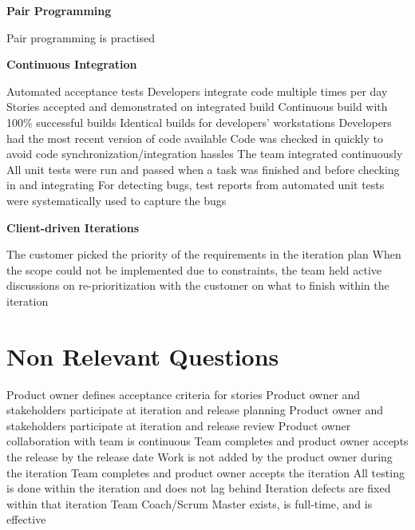 \begin{appendices}
\textbf{Pair Programming}
\begin{itemize}
	\taa Pair programming is practised
\end{itemize}

\textbf{Continuous Integration}
\begin{itemize}
	\taa Automated acceptance tests
	\taar Developers integrate code multiple times per day
	\taar Stories accepted and demonstrated on integrated build
	\taar Continuous build with 100\% successful builds
	\taar Identical builds for developers' workstations %
	\pam Developers had the most recent version of code available
	\pam Code was checked in quickly to avoid code synchronization/integration hassles
	\pamr The team integrated continuously
	\pamr All unit tests were run and passed when a task was finished and before checking in and integrating
	\pamr For detecting bugs, test reports from automated unit tests were systematically used to capture the bugs
\end{itemize}

\textbf{Client-driven Iterations}
\begin{itemize}
	\pam The customer picked the priority of the requirements in the iteration plan
	\pamr When the scope could not be implemented due to constraints, the team held active discussions on re-prioritization with the customer on what to finish within the iteration 
\end{itemize}

\section{Non Relevant Questions}

\begin{itemize}
	\taanr Product owner defines acceptance criteria for stories 
	\taanr Product owner and stakeholders participate at iteration and release planning 
	\taanr Product owner and stakeholders participate at iteration and release review 
	\taanr Product owner collaboration with team is continuous  
	\taanr Team completes and product owner accepts the release by the release date	 
	\taanr Work is not added by the product owner during the iteration 
	\taanr Team completes and product owner accepts the iteration  	 
	\taanr All testing is done within the iteration and does not lag behind 
	\taanr Iteration defects are fixed within that iteration 
	\taanr Team Coach/Scrum Master exists, is full-time, and is effective
\end{itemize}



\end{appendices}
